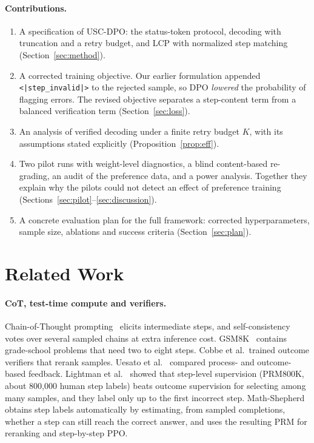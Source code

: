 \documentclass[11pt, a4paper]{article}
\newcommand{\invalid}{\texttt{<|step\_\allowbreak invalid|>}}
\begin{document}
\paragraph{Contributions.}
\begin{enumerate}
    \item A specification of USC-DPO: the status-token protocol, decoding with truncation and a retry budget, and LCP with normalized step matching (Section~\ref{sec:method}).
    \item A corrected training objective. Our earlier formulation appended \invalid{} to the rejected sample, so DPO \emph{lowered} the probability of flagging errors. The revised objective separates a step-content term from a balanced verification term (Section~\ref{sec:loss}).
    \item An analysis of verified decoding under a finite retry budget $K$, with its assumptions stated explicitly (Proposition~\ref{prop:eff}).
    \item Two pilot runs with weight-level diagnostics, a blind content-based re-grading, an audit of the preference data, and a power analysis. Together they explain why the pilots could not detect an effect of preference training (Sections~\ref{sec:pilot}--\ref{sec:discussion}).
    \item A concrete evaluation plan for the full framework: corrected hyperparameters, sample size, ablations and success criteria (Section~\ref{sec:plan}).
\end{enumerate}

\section{Related Work}
\label{sec:related}
\paragraph{CoT, test-time compute and verifiers.}
Chain-of-Thought prompting~\cite{wei2022chain} elicits intermediate steps, and self-consistency~\cite{wang2023selfconsistency} votes over several sampled chains at extra inference cost. GSM8K~\cite{cobbe2021training} contains grade-school problems that need two to eight steps. Cobbe et al.\ trained outcome verifiers that rerank samples. Uesato et al.~\cite{uesato2022solving} compared process- and outcome-based feedback. Lightman et al.~\cite{lightman2023let} showed that step-level supervision (PRM800K, about 800{,}000 human step labels) beats outcome supervision for selecting among many samples, and they label only up to the first incorrect step. Math-Shepherd~\cite{wang2024mathshepherd} obtains step labels automatically by estimating, from sampled completions, whether a step can still reach the correct answer, and uses the resulting PRM for reranking and step-by-step PPO.
\end{document}
